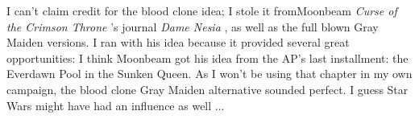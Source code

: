 I can't claim credit for the blood clone idea; I stole it fromMoonbeam  {\itshape Curse of the Crimson Throne} 's journal  {\itshape Dame Nesia} , as well as the full blown Gray Maiden versions. I ran with his idea because it provided several great opportunities: I think Moonbeam got his idea from the AP's last installment: the Everdawn Pool in the Sunken Queen. As I won't be using that chapter in my own campaign, the blood clone Gray Maiden alternative sounded perfect. I guess Star Wars might have had an influence as well ... 